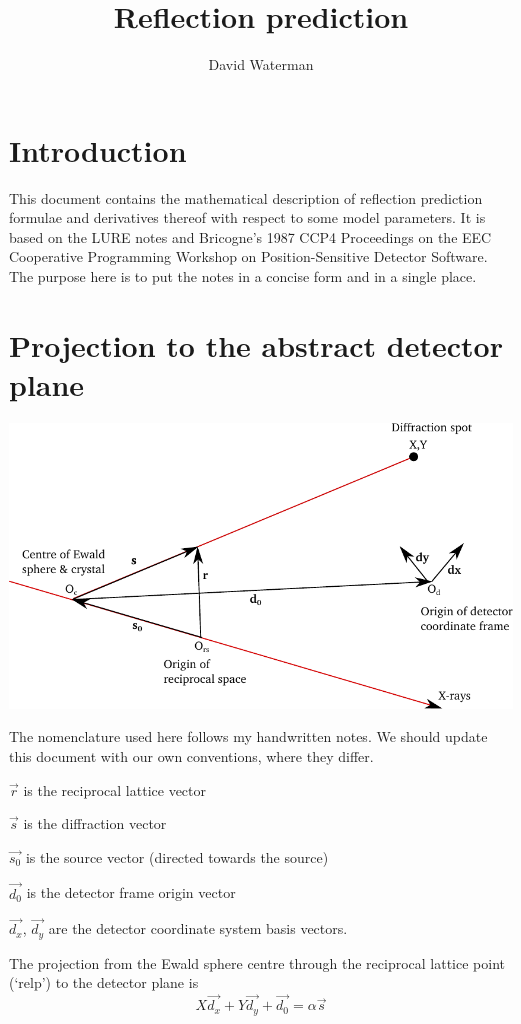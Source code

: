\documentclass{article}
\title{Reflection prediction}
\author{David Waterman}
\date{}
\begin{document}
\maketitle

\section*{Introduction}
This document contains the mathematical description of reflection prediction formulae and derivatives thereof with respect to some model parameters.
It is based on the LURE notes and Bricogne's 1987 CCP4 Proceedings on the EEC Cooperative Programming Workshop on Position-Sensitive
Detector Software. The purpose here is to put the notes in a concise form and in a single place.

\section*{Projection to the abstract detector plane}
\begin{center}
\includegraphics{diffraction_geometry.pdf}
\end{center}
The nomenclature used here follows my handwritten notes. We should update this document with our own conventions, where they differ.

$\vec{r}$ is the reciprocal lattice vector

$\vec{s} $ is the diffraction vector

$\vec{s_0}$ is the source vector (directed towards the source)

$\vec{d_0}$ is the detector frame origin vector

$\vec{d_x}$, $\vec{d_y}$ are the detector coordinate system basis vectors.


The projection from the Ewald sphere centre through the reciprocal lattice point (`relp') to the detector plane is
%
\begin{equation}
X \vec{d_x} + Y \vec{d_y} + \vec{d_0} = \alpha \vec{s}
\end{equation}
\end{document}
